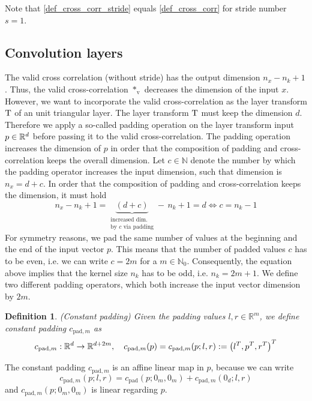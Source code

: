 \documentclass[twoside,a4paper]{article}
\newtheorem{definition}{Definition}
\begin{document}

Note that \cref{def_cross_corr_stride} equals \cref{def_cross_corr} for stride number $s=1$.

\subsection{Convolution layers}

The valid cross correlation (without stride) has the output dimension $n_x - n_k + 1$.
Thus, the valid cross-correlation $*_{\text{v}}$ decreases the dimension of the input $x$.
However, we want to incorporate the valid cross-correlation as the layer transform $\mathrm{T}$ of an
unit triangular layer. The layer transform $\mathrm{T}$ must keep the dimension $d$.
Therefore we apply a so-called padding operation on the layer transform input $p \in \mathbb{R}^d$ 
before passing it to the valid
cross-correlation. The padding operation increases the dimension of $p$ in order
that the composition of padding and cross-correlation keeps the overall dimension.
Let $c \in \mathbb{N}$ denote the number by which the padding operator increases 
the input dimension, such that dimension is $n_x = d+c$. 
In order that the composition of padding and cross-correlation keeps the dimension, it must hold
\begin{equation*}
	n_x - n_k + 1 = \underbrace{(d+c)}_{\substack{
		\text{increased dim.} \\
		\text{by } c \text{ via padding}
	}} - \, n_k + 1 = d \iff c = n_k-1
\end{equation*}
For symmetry reasons, we pad the same number of values at the beginning and 
the end of the input vector $p$. This means that the number of padded values $c$ has to be even,
i.e. we can write $c=2m$ for a $m \in \mathbb{N}_0$.
Consequently, the equation above implies that the kernel size $n_k$ has to be odd, i.e. 
$n_k = 2m+1$. We define two different padding operators,
which both increase the input vector dimension by $2m$.

\begin{definition}
	(Constant padding)
	Given the padding values $l,r \in \mathbb{R}^m$, we define constant padding 
	$c_{\text{pad},m}$ as
	\begin{equation*}
		c_{\text{pad},m} : \mathbb{R}^d \to \mathbb{R}^{d+2m},
		\quad c_{\text{pad},m}(p) = c_{\text{pad},m}(p;l,r) := \left( l^T, p^T, r^T \right)^T
	\end{equation*}
\end{definition}
The constant padding $c_{\text{pad},m}$ is an affine linear map in $p$, because we can write
\begin{equation}\label{cpad_affine}
	c_{\text{pad},m}(p;l,r) = c_{\text{pad}}(p;0_m,0_m)
	+ c_{\text{pad},m}(0_d;l,r)
\end{equation}
and $c_{\text{pad},m}(p;0_m,0_m)$ is linear regarding $p$.
\end{document}
